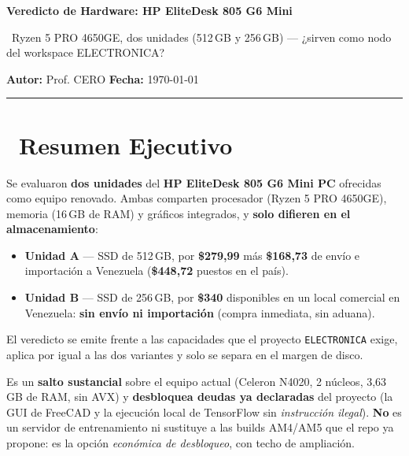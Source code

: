 \documentclass[11pt,a4paper]{article}
\newcommand{\iconoBanda}{microchip}
\newcommand{\bandaTitulo}[3][fondoOscuro]{%
  \begin{tcolorbox}[
    enhanced,
    colback=#1, colframe=#1,
    boxrule=0pt, arc=8pt, outer arc=8pt,
    width=\linewidth,
    top=18pt, bottom=6pt, left=14pt, right=14pt,
    borderline south={3.5pt}{0pt}{cyanNeon},
  ]
    \begin{minipage}[c]{0.07\linewidth}
      \centering
      \textcolor{cyanNeon}{\fontsize{30}{30}\selectfont\faIcon{\iconoBanda}}
    \end{minipage}%
    \hspace{8pt}%
    \begin{minipage}[c]{0.88\linewidth}
      {\fontsize{20}{24}\selectfont\bfseries\color{white}#2}\par\vspace{5pt}%
      \textcolor{cyanNeon!80!white}{\small\faIcon{angle-right}~#3}%
    \end{minipage}
    \vspace{4pt}
  \end{tcolorbox}%
  \vspace{8pt}%
}
\newcommand{\iconotexto}[2]{\textcolor{cyanNeon}{\faIcon{#1}}~#2}
\renewcommand{\iconoBanda}{desktop}
\begin{document}
\bandaTitulo{Veredicto de Hardware: HP EliteDesk 805 G6 Mini}{Ryzen 5 PRO 4650GE, dos unidades (512\,GB y 256\,GB) --- ¿sirven como nodo del workspace ELECTRONICA?}

\begin{center}
  \vspace{2pt}
  {\large \textbf{Autor:} Prof. CERO \hfill \textbf{Fecha:} \today} \\[6pt]
  \color{cyanNeon}\rule{\linewidth}{0.4pt}
\end{center}

\tableofcontents
\newpage

\section[Resumen Ejecutivo]{\iconotexto{info-circle}{Resumen Ejecutivo}}

Se evaluaron \textbf{dos unidades} del \textbf{HP EliteDesk 805 G6 Mini PC} ofrecidas
como equipo renovado. Ambas comparten procesador (Ryzen 5 PRO 4650GE), memoria
(16\,GB de RAM) y gráficos integrados, y \textbf{solo difieren en el almacenamiento}:

\begin{itemize}[leftmargin=1.4em]
    \item \textbf{Unidad A} --- SSD de 512\,GB, por \textbf{\$279{,}99} más
    \textbf{\$168{,}73} de envío e importación a Venezuela (\textbf{\$448{,}72} puestos en
    el país).
    \item \textbf{Unidad B} --- SSD de 256\,GB, por \textbf{\$340} disponibles en un local
    comercial en Venezuela: \textbf{sin envío ni importación} (compra inmediata, sin aduana).
\end{itemize}

El veredicto se emite frente a las capacidades que el proyecto \texttt{ELECTRONICA}
exige, aplica por igual a las dos variantes y solo se separa en el margen de disco.

\begin{tcolorbox}[cajaFortaleza, title={\faIcon{thumbs-up}~Veredicto rápido: SÍ sirve}]
Es un \textbf{salto sustancial} sobre el equipo actual (Celeron N4020, 2 núcleos,
3{,}63\,GB de RAM, sin AVX) y \textbf{desbloquea deudas ya declaradas} del proyecto
(la GUI de FreeCAD y la ejecución local de TensorFlow sin \emph{instrucción ilegal}).
\textbf{No} es un servidor de entrenamiento ni sustituye a las builds AM4/AM5 que el
repo ya propone: es la opción \emph{económica de desbloqueo}, con techo de ampliación.
\end{tcolorbox}
\end{document}

